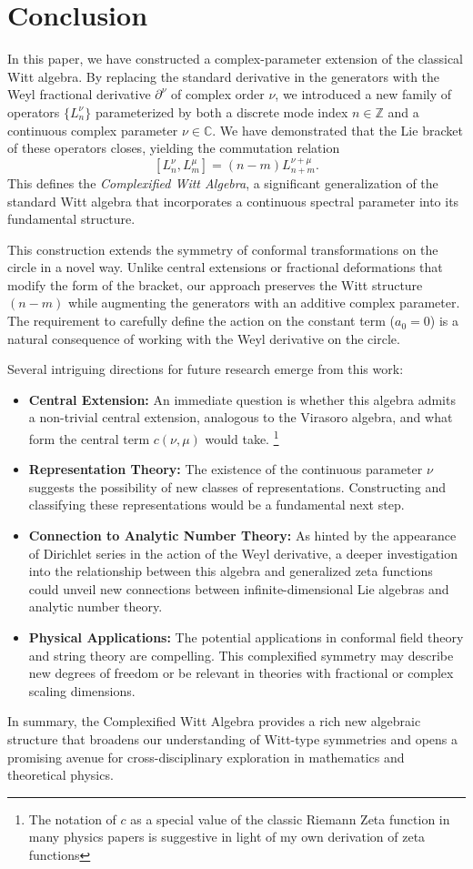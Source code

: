 \documentclass{artjlt}
\newcommand{\?}{\textbackslash}
\begin{document}
\section{Conclusion}
In this paper, we have constructed a complex-parameter extension of the classical Witt algebra. By replacing the standard derivative in the generators with the Weyl fractional derivative $\partial^\nu$ of complex order $\nu$, we introduced a new family of operators $\{L^\nu_n\}$ parameterized by both a discrete mode index $n \in \mathbb{Z}$ and a continuous complex parameter $\nu \in \mathbb{C}$. We have demonstrated that the Lie bracket of these operators closes, yielding the commutation relation
\[
[L^\nu_n, L^\mu_m] = (n - m) L^{\nu + \mu}_{n + m}.
\]
This defines the \emph{Complexified Witt Algebra}, a significant generalization of the standard Witt algebra that incorporates a continuous spectral parameter into its fundamental structure.

This construction extends the symmetry of conformal transformations on the circle in a novel way. Unlike central extensions or fractional deformations that modify the form of the bracket, our approach preserves the Witt structure $(n-m)$ while augmenting the generators with an additive complex parameter. The requirement to carefully define the action on the constant term ($a_0 = 0$) is a natural consequence of working with the Weyl derivative on the circle.

Several intriguing directions for future research emerge from this work:
\begin{itemize}
    \item \textbf{Central Extension:} An immediate question is whether this algebra admits a non-trivial central extension, analogous to the Virasoro algebra, and what form the central term $c(\nu, \mu)$ would take. \footnote{The notation of $c$ as a special value of the classic Riemann Zeta function in many physics papers is suggestive in light of my own derivation of zeta functions}
    \item \textbf{Representation Theory:} The existence of the continuous parameter $\nu$ suggests the possibility of new classes of representations. Constructing and classifying these representations would be a fundamental next step.
    \item \textbf{Connection to Analytic Number Theory:} As hinted by the appearance of Dirichlet series in the action of the Weyl derivative, a deeper investigation into the relationship between this algebra and generalized zeta functions could unveil new connections between infinite-dimensional Lie algebras and analytic number theory.
    \item \textbf{Physical Applications:} The potential applications in conformal field theory and string theory are compelling. This complexified symmetry may describe new degrees of freedom or be relevant in theories with fractional or complex scaling dimensions.
\end{itemize}
In summary, the Complexified Witt Algebra provides a rich new algebraic structure that broadens our understanding of Witt-type symmetries and opens a promising avenue for cross-disciplinary exploration in mathematics and theoretical physics.
\end{document}
